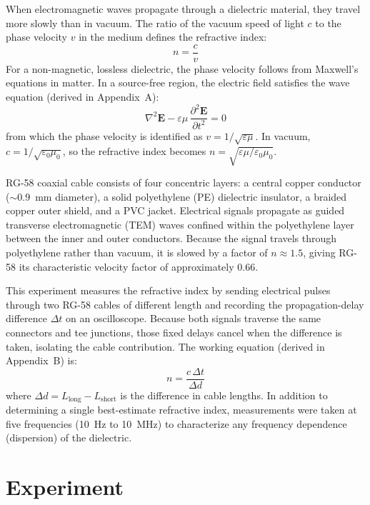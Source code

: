 \documentclass[12pt]{article}
\begin{document}
When electromagnetic waves propagate through a dielectric material, they travel more slowly than in vacuum. The ratio of the vacuum speed of light $c$ to the phase velocity $v$ in the medium defines the refractive index:
\begin{equation}
n = \frac{c}{v}
\label{eq:n_def}
\end{equation}
For a non-magnetic, lossless dielectric, the phase velocity follows from Maxwell's equations in matter. In a source-free region, the electric field satisfies the wave equation (derived in Appendix~A):
\begin{equation}
\nabla^2 \mathbf{E} - \varepsilon\mu\,\frac{\partial^2 \mathbf{E}}{\partial t^2} = 0
\label{eq:wave}
\end{equation}
from which the phase velocity is identified as $v = 1/\sqrt{\varepsilon\mu}$. In vacuum, $c = 1/\sqrt{\varepsilon_0 \mu_0}$, so the refractive index becomes $n = \sqrt{\varepsilon\mu/\varepsilon_0\mu_0}$.

RG-58 coaxial cable consists of four concentric layers: a central copper conductor (${\sim}0.9$~mm diameter), a solid polyethylene (PE) dielectric insulator, a braided copper outer shield, and a PVC jacket. Electrical signals propagate as guided transverse electromagnetic (TEM) waves confined within the polyethylene layer between the inner and outer conductors. Because the signal travels through polyethylene rather than vacuum, it is slowed by a factor of $n \approx 1.5$, giving RG-58 its characteristic velocity factor of approximately 0.66.

This experiment measures the refractive index by sending electrical pulses through two RG-58 cables of different length and recording the propagation-delay difference $\Delta t$ on an oscilloscope. Because both signals traverse the same connectors and tee junctions, those fixed delays cancel when the difference is taken, isolating the cable contribution. The working equation (derived in Appendix~B) is:
\begin{equation}
n = \frac{c\,\Delta t}{\Delta d}
\label{eq:working}
\end{equation}
where $\Delta d = L_{\text{long}} - L_{\text{short}}$ is the difference in cable lengths. In addition to determining a single best-estimate refractive index, measurements were taken at five frequencies (10~Hz to 10~MHz) to characterize any frequency dependence (dispersion) of the dielectric.

\section{Experiment}
\end{document}
